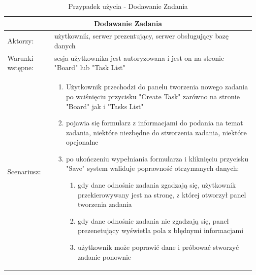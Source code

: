 \begin{table}[h!]
\begin{tabular}{ |p{2cm}||p{13cm}|  }
	
	\hline
	\multicolumn{2}{|c|}{Dodawanie Zadania} \\
	\hline
Aktorzy: &użytkownik, serwer prezentujący, serwer obsługujący bazę danych\\
	\hline
Warunki wstępne: &sesja użytkownika jest autoryzowana i jest on na stronie "Board" lub "Task List"\\
	\hline
	Scenariusz: &

\begin{enumerate}
	\item Użytkownik przechodzi do panelu tworzenia nowego zadania po wciśnięciu przycisku "Create Task" zarówno na stronie "Board" jak i "Tasks List"
	\item pojawia się formularz z informacjami do podania na temat zadania, niektóre niezbędne do stworzenia zadania, niektóre opcjonalne
	\item po ukończeniu wypełniania formularza i kliknięciu przycisku "Save" system waliduje poprawność otrzymanych danych:
	\begin{enumerate}
		\item gdy dane odnośnie zadania zgadzają się, użytkownik przekierowywany jest na stronę, z której otworzył panel tworzenia zadania
		\item gdy dane odnośnie zadania nie zgadzają się, panel prezenetujący wyświetla pola z błędnymi informacjami
		\item użytkownik może poprawić dane i próbować stworzyć zadanie ponownie
	\end{enumerate}
\end{enumerate}\\
\hline
\end{tabular}
	\caption{Przypadek użycia - Dodawanie Zadania}
\end{table}



